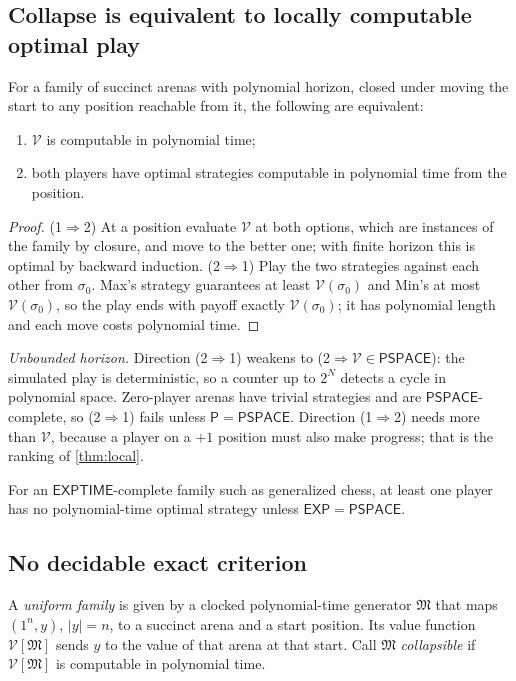 \documentclass[final]{siamart0516}
\numberwithin{theorem}{section}
\numberwithin{equation}{section}
\theoremstyle{siamnonum}
\theoremstyle{plain}
\newcommand{\val}{\mathcal{V}}            %
\newcommand{\cls}[1]{\mathsf{#1}}
\newcommand{\PSPACE}{\cls{PSPACE}}
\newcommand{\EXP}{\cls{EXP}}
\newcommand{\EXPTIME}{\cls{EXPTIME}}
\newcommand{\Pclass}{\cls{P}}
\begin{document}
\subsection{Collapse is equivalent to locally computable optimal play}
\begin{theorem}\label{thm:strategies}
For a family of succinct arenas with polynomial horizon, closed under moving the start to any position reachable from it, the following are equivalent:
\begin{enumerate}[label=\textup{(\arabic*)}]
\item $\val$ is computable in polynomial time;
\item both players have optimal strategies computable in polynomial time from the position.
\end{enumerate}
\end{theorem}
\begin{proof}
(1$\Rightarrow$2) At a position evaluate $\val$ at both options, which are instances of the family by closure, and move to the better one; with finite horizon this is optimal by backward induction. (2$\Rightarrow$1) Play the two strategies against each other from $\sigma_0$. Max's strategy guarantees at least $\val(\sigma_0)$ and Min's at most $\val(\sigma_0)$, so the play ends with payoff exactly $\val(\sigma_0)$; it has polynomial length and each move costs polynomial time.
\end{proof}

\noindent\emph{Unbounded horizon.} Direction (2$\Rightarrow$1) weakens to (2$\Rightarrow\val\in\PSPACE$): the simulated play is deterministic, so a counter up to $2^N$ detects a cycle in polynomial space. Zero-player arenas have trivial strategies and are $\PSPACE$-complete, so (2$\Rightarrow$1) fails unless $\Pclass=\PSPACE$. Direction (1$\Rightarrow$2) needs more than $\val$, because a player on a $+1$ position must also make progress; that is the ranking of \cref{thm:local}.

\begin{corollary}\label{cor:chess}
For an $\EXPTIME$-complete family such as generalized chess, at least one player has no polynomial-time optimal strategy unless $\EXP=\PSPACE$.
\end{corollary}

\subsection{No decidable exact criterion}
A \emph{uniform family} is given by a clocked polynomial-time generator $\mathfrak M$ that maps $(1^n,y)$, $|y|=n$, to a succinct arena and a start position. Its value function $\val[\mathfrak M]$ sends $y$ to the value of that arena at that start. Call $\mathfrak M$ \emph{collapsible} if $\val[\mathfrak M]$ is computable in polynomial time.
\end{document}
